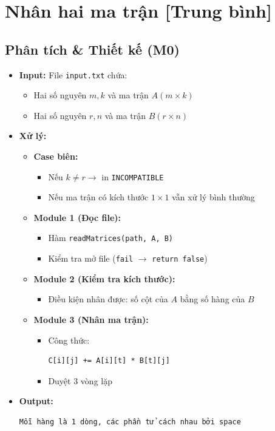 \section{Nhân hai ma trận [Trung bình]}
\subsection{Phân tích \& Thiết kế (M0)}
\begin{itemize}
    \item \textbf{Input:}
    File \texttt{input.txt} chứa:
    \begin{itemize}
        \item Hai số nguyên $m, k$ và ma trận $A(m \times k)$
        \item Hai số nguyên $r, n$ và ma trận $B(r \times n)$
    \end{itemize}

    \item \textbf{Xử lý:}
    \begin{itemize}
        \item \textbf{Case biên:}
        \begin{itemize}
            \item Nếu $k \ne r \rightarrow$ in \texttt{INCOMPATIBLE}
            \item Nếu ma trận có kích thước $1 \times 1$ vẫn xử lý bình thường
        \end{itemize}

        \item \textbf{Module 1 (Đọc file):}
        \begin{itemize}
            \item Hàm \texttt{readMatrices(path, A, B)}
            \item Kiểm tra mở file (\texttt{fail} $\rightarrow$ \texttt{return false})
        \end{itemize}

        \item \textbf{Module 2 (Kiểm tra kích thước):}
        \begin{itemize}
            \item Điều kiện nhân được: số cột của $A$ bằng số hàng của $B$
        \end{itemize}

        \item \textbf{Module 3 (Nhân ma trận):}
        \begin{itemize}
            \item Công thức:
            \begin{lstlisting}
C[i][j] += A[i][t] * B[t][j]
            \end{lstlisting}
            \item Duyệt 3 vòng lặp
        \end{itemize}
    \end{itemize}

    \item \textbf{Output:}
    \begin{lstlisting}
Mỗi hàng là 1 dòng, các phần tử cách nhau bởi space
    \end{lstlisting}
\end{itemize}

